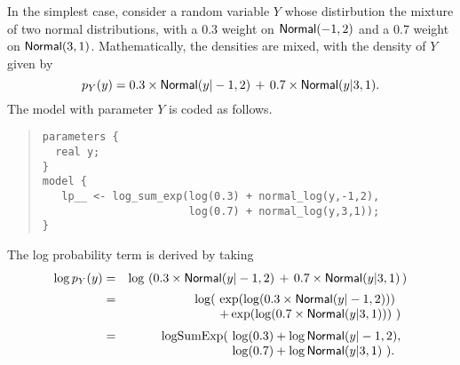 In the simplest case, consider a random variable $Y$ whose
distirbution the mixture of two normal distributions, with a 0.3
weight on $\mbox{\sf Normal}(-1,2)$ and a 0.7 weight on
$\mbox{\sf Normal}(3,1)$.  Mathematically, the densities are mixed, with
the density of $Y$ given by
\[
p_Y(y) = 0.3 \times \mbox{\sf Normal}(y|-1,2) \, + \, 0.7 \times \mbox{\sf Normal}(y|3,1).
\]
%
The \Stan model with parameter $Y$ is coded as follows.
%
\begin{quote}
\begin{Verbatim}
parameters {
  real y;
}
model {
   lp__ <- log_sum_exp(log(0.3) + normal_log(y,-1,2),
                       log(0.7) + normal_log(y,3,1));
}
\end{Verbatim}
\end{quote}
%
The log probability term is derived by taking
\begin{eqnarray*}
\log p_Y(y) & = & \log \, \left( 0.3 \times \mbox{\sf Normal}(y|-1,2) \, + \,
  0.7 \times
  \mbox{\sf Normal}(y|3,1) \, \right)
\\[2pt]
& = & \log(\! \begin{array}[t]{l}
                 \exp(\log(0.3 \times \mbox{\sf Normal}(y|-1,2))) \\
                 + \exp(\log(0.7 \times \mbox{\sf Normal}(y|3,1))) \ )
              \end{array}
\\[2pt]
& = & \mbox{logSumExp}(\! \begin{array}[t]{l}
                         \log(0.3) + \log \mbox{\sf Normal}(y|-1,2),
                         \\                  
                         \log(0.7) + \log \mbox{\sf Normal}(y|3,1) \ ).
                       \end{array}
\end{eqnarray*}


